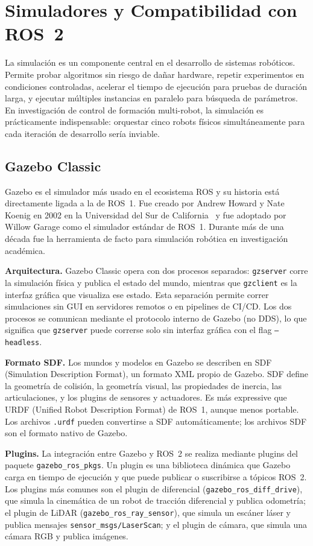 \section{Simuladores y Compatibilidad con ROS~2}

La simulación es un componente central en el desarrollo de sistemas robóticos. Permite probar algoritmos sin riesgo de dañar hardware, repetir experimentos en condiciones controladas, acelerar el tiempo de ejecución para pruebas de duración larga, y ejecutar múltiples instancias en paralelo para búsqueda de parámetros. En investigación de control de formación multi-robot, la simulación es prácticamente indispensable: orquestar cinco robots físicos simultáneamente para cada iteración de desarrollo sería inviable.

\subsection{Gazebo Classic}

Gazebo es el simulador más usado en el ecosistema ROS y su historia está directamente ligada a la de ROS~1. Fue creado por Andrew Howard y Nate Koenig en 2002 en la Universidad del Sur de California~\cite{koenig2004design} y fue adoptado por Willow Garage como el simulador estándar de ROS~1. Durante más de una década fue la herramienta de facto para simulación robótica en investigación académica.

\textbf{Arquitectura.} Gazebo Classic opera con dos procesos separados: \texttt{gzserver} corre la simulación física y publica el estado del mundo, mientras que \texttt{gzclient} es la interfaz gráfica que visualiza ese estado. Esta separación permite correr simulaciones sin GUI en servidores remotos o en pipelines de CI/CD. Los dos procesos se comunican mediante el protocolo interno de Gazebo (no DDS), lo que significa que \texttt{gzserver} puede correrse solo sin interfaz gráfica con el flag \texttt{--headless}.

\textbf{Formato SDF.} Los mundos y modelos en Gazebo se describen en SDF (Simulation Description Format), un formato XML propio de Gazebo. SDF define la geometría de colisión, la geometría visual, las propiedades de inercia, las articulaciones, y los plugins de sensores y actuadores. Es más expressive que URDF (Unified Robot Description Format) de ROS~1, aunque menos portable. Los archivos \texttt{.urdf} pueden convertirse a SDF automáticamente; los archivos SDF son el formato nativo de Gazebo.

\textbf{Plugins.} La integración entre Gazebo y ROS~2 se realiza mediante plugins del paquete \texttt{gazebo\_ros\_pkgs}. Un plugin es una biblioteca dinámica que Gazebo carga en tiempo de ejecución y que puede publicar o suscribirse a tópicos ROS~2. Los plugins más comunes son el plugin de diferencial (\texttt{gazebo\_ros\_diff\_drive}), que simula la cinemática de un robot de tracción diferencial y publica odometría; el plugin de LiDAR (\texttt{gazebo\_ros\_ray\_sensor}), que simula un escáner láser y publica mensajes \texttt{sensor\_msgs/LaserScan}; y el plugin de cámara, que simula una cámara RGB y publica imágenes.

